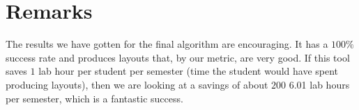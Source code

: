\section{Remarks}

The results we have gotten for the final algorithm are encouraging.
It has a $100\%$ success rate and produces layouts that, by our metric, are very
good. If this tool saves $1$ lab hour per student per semester (time the
student would have spent producing layouts), then we are
looking at a savings of about $200$ 6.01 lab hours per semester, which is a
fantastic success.
